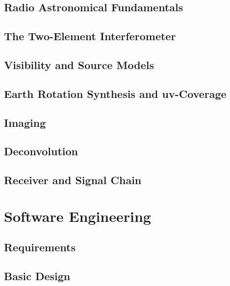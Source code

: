 	\chapter{Radio Astronomical Fundamentals}
	

	\chapter{The Two-Element Interferometer}
	

	\chapter{Visibility and Source Models}
	

	\chapter{Earth Rotation Synthesis and uv-Coverage}
	

	\chapter{Imaging}
	

	\chapter{Deconvolution}
	

	\chapter{Receiver and Signal Chain}
	

\part{Software Engineering}

	\chapter{Requirements}
	

	\chapter{Basic Design}
	

